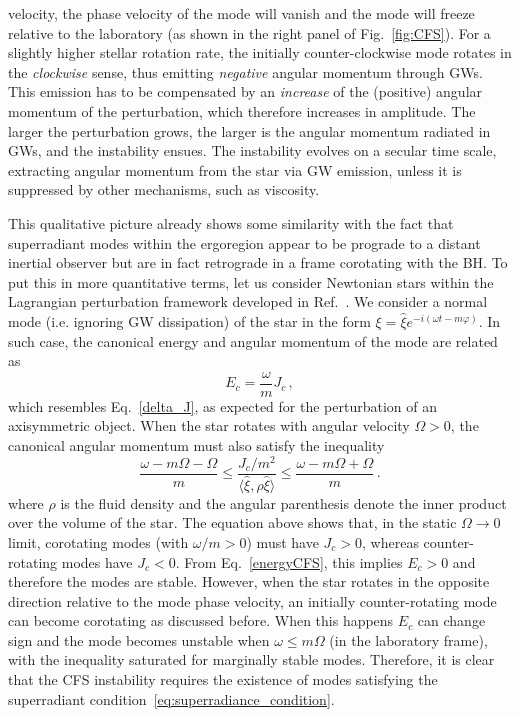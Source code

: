 \documentclass[11pt]{article}
\numberwithin{equation}{section} %
\begin{document}
velocity, the phase velocity of the mode will vanish and the mode will freeze relative to the laboratory (as shown in 
the right panel of Fig.~\ref{fig:CFS}). For a slightly higher stellar rotation rate, the initially counter-clockwise 
mode rotates in the \emph{clockwise} sense, thus emitting \emph{negative} angular momentum through GWs. This emission 
has to be compensated by an \emph{increase} of the (positive) angular momentum of the perturbation, which therefore 
increases in amplitude. The larger the perturbation grows, the larger is the angular momentum radiated in GWs, and the 
instability ensues.
%
The instability evolves on a secular time scale, extracting angular momentum from the star via GW emission, unless it is 
suppressed by other mechanisms, such as viscosity.


This qualitative picture already shows some similarity with the fact that superradiant modes within the ergoregion 
appear to be prograde to a distant inertial observer but are in fact retrograde in a frame corotating with the BH.
%
To put this in more quantitative terms, let us consider Newtonian stars within the Lagrangian perturbation framework 
developed in Ref.~\cite{1978ApJ...221..937F}. We consider a normal mode (i.e. ignoring GW dissipation) of the star in 
the form $\xi=\hat\xi e^{-i(\omega t-m\varphi)}$. In such case, the canonical energy and angular momentum of the mode 
are related as~\cite{1978ApJ...221..937F,Andersson:2006nr}
\begin{equation}
 E_c=\frac{\omega}{m} J_c\,, \label{energyCFS}
\end{equation}
which resembles Eq.~\eqref{delta_J}, as expected for the perturbation of an axisymmetric object. When the star rotates 
with angular velocity $\Omega>0$, the canonical angular momentum must also satisfy the 
inequality~\cite{1978ApJ...221..937F,Andersson:2006nr}
\begin{equation}
 \frac{\omega-m\Omega-\Omega}{m}\leq \frac{J_c/m^2}{\langle \hat\xi,\rho\hat\xi\rangle} \leq 
\frac{\omega-m\Omega+\Omega}{m}\,.
\end{equation}
where $\rho$ is the fluid density and the angular parenthesis denote the inner product over the volume of the star. The 
equation above shows that, in the static $\Omega\to0$ limit, corotating modes (with $\omega/m>0$) must have $J_c>0$, 
whereas counter-rotating modes have $J_c<0$. From Eq.~\eqref{energyCFS}, this implies $E_c>0$ and therefore the modes 
are stable. However, when the star rotates in the opposite direction relative to the mode phase velocity, an initially 
counter-rotating mode can become corotating as discussed before. When this happens $E_c$ can change sign and the mode 
becomes unstable when $\omega\leq m\Omega$ (in the laboratory frame), with the inequality saturated for marginally 
stable modes. Therefore, it is clear that the CFS instability requires the existence of modes satisfying the 
superradiant condition~\eqref{eq:superradiance_condition}.
\end{document}
